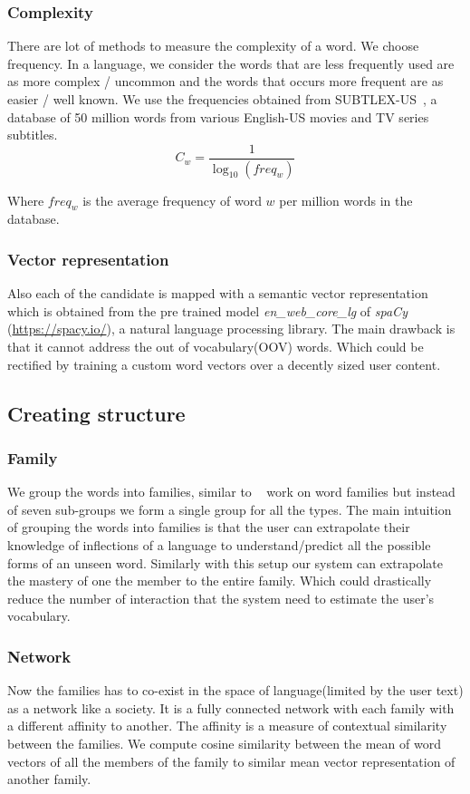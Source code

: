 \documentclass[11pt,a4paper]{article}
\begin{document}
\subsubsection{Complexity}
There are lot of methods to measure the complexity of a word. We choose frequency.
In a language, we consider the words that are less frequently used are as
more complex / uncommon and the words that occurs more frequent are as easier / well known.
We use the frequencies obtained from SUBTLEX-US~\citet{brysbaert2009moving}, a database of 50 million
words from various English-US movies and TV series subtitles.
\begin{equation}
  C_w = \frac{1}{\log_{10}(freq_w)}
\end{equation}

Where ${freq_w}$ is the average frequency of word $w$ per million words in the
database.

\subsubsection{Vector representation}
Also each of the candidate is mapped with a semantic vector representation which
is obtained from the pre trained model \emph{en\_web\_core\_lg} of \emph{spaCy}
(\url{https://spacy.io/}), a natural language processing library. The main
drawback is that it cannot address the out of vocabulary(OOV) words. Which
could be rectified by training a custom word vectors over a decently sized user content.

\subsection{Creating structure}

\subsubsection{Family}
We group the words into families, similar to ~\citet{bauer1993word} work on word
families but instead of seven sub-groups we form a single group for all the types.
The main intuition of grouping the words into families is that the user can
extrapolate their knowledge of inflections of a language to understand/predict
all the possible forms of an unseen word. Similarly with this setup our system
can extrapolate the mastery of one the member to the entire family. Which could 
drastically reduce the number of interaction that the system need to estimate
the user's vocabulary.

\subsubsection{Network}
Now the families has to co-exist in the space of language(limited by the
user text) as a network like a society. It is a fully connected network with each
family with a different affinity to another. The affinity is a measure of
contextual similarity between the families. We compute cosine similarity 
between the mean of word vectors of all the members of the family to similar
mean vector representation of another family.
\end{document}
